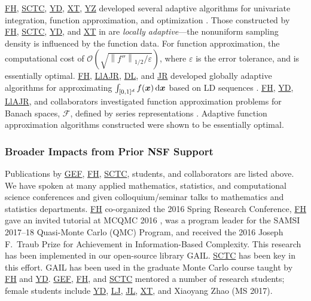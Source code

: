 \documentclass[11pt]{NSFamsart}
\newcommand{\FH}{\hyperlink{FHlink}{FH}\xspace}
\newcommand{\SCTC}{\hyperlink{SCTClink}{SCTC}\xspace}
\newcommand{\GEF}{\hyperlink{GEFlink}{GEF}\xspace}
\newcommand{\YD}{\hyperlink{YDlink}{YD}\xspace}
\newcommand{\JR}{\hyperlink{JRlink}{JR}\xspace}
\newcommand{\LlAJR}{\hyperlink{LlAJRlink}{LlAJR}\xspace}
\newcommand{\LJ}{\hyperlink{LJlink}{LJ}\xspace}
\newcommand{\XT}{\hyperlink{XTlink}{XT}\xspace}
\newcommand{\DL}{\hyperlink{DLlink}{DL}\xspace}
\newcommand{\JL}{\hyperlink{JLlink}{JL}\xspace}
\newcommand{\YZ}{\hyperlink{YZlink}{YZ}\xspace}
\newcommand{\GAIL}{GAIL\xspace}
\newcommand{\bx}{{\boldsymbol{x}}}
\def\dif{\textup{d}}
\newcommand{\calf}{{\mathcal{F}}}
\newcommand{\norm}[2][{}]{\ensuremath{\left \lVert #2 \right \rVert}_{#1}}
\newcommand{\Order}{\mathcal{O}}
\begin{document}
\FH, \SCTC, \YD, \XT, \YZ developed several adaptive algorithms for univariate integration, function approximation, and optimization \cite{ChoEtal17a,HicEtal14b,  Din15a, Ton14a, Zha18a}.  Those constructed by \FH, \SCTC, \YD, and \XT in \cite{ChoEtal17a} are \emph{locally adaptive}---the nonuniform sampling density is influenced by the function data.  For function approximation, the computational cost of $\Order\left(\sqrt{\norm[1/2]{f''}/\varepsilon} \right)$, where $\varepsilon$ is the error tolerance, and is essentially optimal. 
\FH, \LlAJR, \DL, and \JR developed globally adaptive algorithms for approximating $\int_{[0,1]^d} f(\bx) \, \dif \bx$ based on LD sequences \cite{HicJim16a,HicEtal17a,JimHic16a}. 
\FH, \YD, \LlAJR, and collaborators investigated function approximation problems for Banach spaces, $\calf$, defined by series representations \cite{DinHic20a,DinEtal20a}.  Adaptive function approximation algorithms constructed were shown to be essentially optimal.


\subsubsection{Broader Impacts from Prior NSF Support} \label{prevBIsect}
Publications by \GEF, \FH,  \SCTC, students, and collaborators are listed above.  We have spoken at many applied mathematics, statistics,
and computational science conferences and given colloquium/seminar talks to mathematics and
statistics departments.  \FH co-organized the
2016 Spring Research
Conference, \FH gave an invited tutorial
at MCQMC 2016
\cite{Hic17a}, was a program leader for the SAMSI 2017--18 Quasi-Monte Carlo (QMC) Program, and received the 2016 Joseph F.\ Traub Prize for Achievement in Information-Based Complexity.  This research has been implemented in our open-source library
\GAIL \cite{ChoEtal21a}.  \SCTC has been key in this effort.  \GAIL has been used in the graduate Monte Carlo course taught by \FH and \YD. \GEF, \FH, and \SCTC mentored a number of
research students;  female students include \YD, \LJ, \JL, \XT, and Xiaoyang Zhao (MS 2017).
\end{document}
